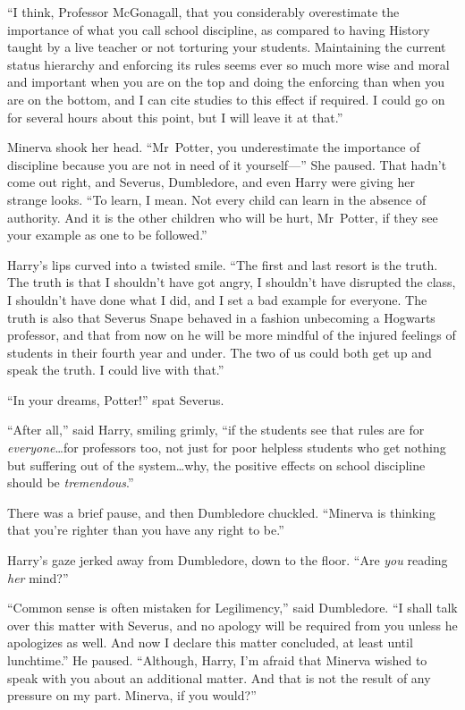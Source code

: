 “I think, Professor McGonagall, that you considerably overestimate the importance of what you call school discipline, as compared to having History taught by a live teacher or not torturing your students. Maintaining the current status hierarchy and enforcing its rules seems ever so much more wise and moral and important when you are on the top and doing the enforcing than when you are on the bottom, and I can cite studies to this effect if required. I could go on for several hours about this point, but I will leave it at that.”

Minerva shook her head. “Mr~Potter, you underestimate the importance of discipline because you are not in need of it yourself—” She paused. That hadn’t come out right, and Severus, Dumbledore, and even Harry were giving her strange looks. “To learn, I mean. Not every child can learn in the absence of authority. And it is the other children who will be hurt, Mr~Potter, if they see your example as one to be followed.”

Harry’s lips curved into a twisted smile. “The first and last resort is the truth. The truth is that I shouldn’t have got angry, I shouldn’t have disrupted the class, I shouldn’t have done what I did, and I set a bad example for everyone. The truth is also that Severus Snape behaved in a fashion unbecoming a Hogwarts professor, and that from now on he will be more mindful of the injured feelings of students in their fourth year and under. The two of us could both get up and speak the truth. I could live with that.”

“In your dreams, Potter!” spat Severus.

“After all,” said Harry, smiling grimly, “if the students see that rules are for \emph{everyone}…for professors too, not just for poor helpless students who get nothing but suffering out of the system…why, the positive effects on school discipline should be \emph{tremendous}.”

There was a brief pause, and then Dumbledore chuckled. “Minerva is thinking that you’re righter than you have any right to be.”

Harry’s gaze jerked away from Dumbledore, down to the floor. “Are \emph{you} reading \emph{her} mind?”

“Common sense is often mistaken for Legilimency,” said Dumbledore. “I shall talk over this matter with Severus, and no apology will be required from you unless he apologizes as well. And now I declare this matter concluded, at least until lunchtime.” He paused. “Although, Harry, I’m afraid that Minerva wished to speak with you about an additional matter. And that is not the result of any pressure on my part. Minerva, if you would?”

